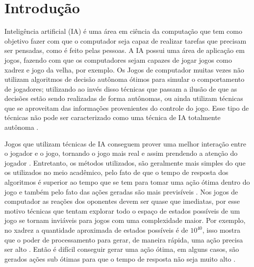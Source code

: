 \chapter{\label{chap:intro}Introdução}

Inteligência artificial (IA) é uma área em ciência da computação que tem como objetivo fazer com que o computador seja capaz de realizar tarefas que precisam ser pensadas, como é feito pelas pessoas. A IA possui uma área de aplicação em jogos, fazendo com que os computadores sejam capazes de jogar jogos como xadrez e jogo da velha, por exemplo. 
Os Jogos de computador muitas vezes não utilizam algoritmos de decisão autônoma ótimos para simular o comportamento de jogadores; utilizando ao invés disso técnicas que passam a ilusão de que as decisões estão sendo realizadas de forma autônomas, ou ainda utilizam técnicas que se aproveitam das informações provenientes do controle do jogo. Esse tipo de técnicas não pode ser caracterizado como uma técnica de IA totalmente autônoma \cite{millington2009artificial}.

Jogos que utilizam técnicas de IA conseguem prover uma melhor interação entre o jogador e o jogo, tornando o jogo mais real e assim prendendo a atenção do jogador \cite{millington2009artificial}.
Entretanto, os métodos utilizados, são geralmente mais simples do que os utilizados no meio acadêmico, pelo fato de que o tempo de resposta dos algoritmos é superior ao tempo que se tem para tomar uma ação ótima dentro do jogo e também pelo fato das ações geradas são mais previsíveis \cite{intelligence2003modern}.
Nos jogos de computador as reações dos oponentes devem ser quase que imediatas, por esse motivo técnicas que tentam explorar todo o espaço de estados possíveis de um jogo se tornam inviáveis para jogos com uma complexidade maior.
Por exemplo, no xadrez a quantidade aproximada de estados possíveis é de $10^{40}$, isso mostra que o poder de processamento para gerar, de maneira rápida, uma ação precisa ser alto \cite{millington2009artificial}. 
Então é difícil conseguir gerar uma ação ótima, em alguns casos, são gerados ações sub ótimas para que o tempo de resposta não seja muito alto \cite{intelligence2003modern}. 

